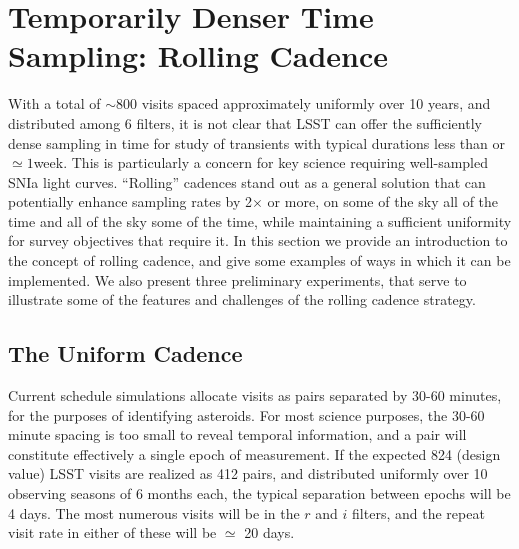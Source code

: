 %
%
%

\section{Temporarily Denser Time Sampling: Rolling Cadence}
\def\secname{rolling}\label{sec:\secname}


With a total of $\sim 800$ visits spaced approximately uniformly over 10
years, and distributed among 6 filters, it is not clear that LSST can
offer the sufficiently dense sampling in time for study of transients
with typical durations less than or $\simeq 1$week. This is particularly
a concern for key science requiring well-sampled SNIa light curves.
``Rolling'' cadences stand out as a general solution that can
potentially enhance sampling rates by 2$\times$ or more, on some of the
sky all of the time and all of the sky some of the time, while
maintaining a sufficient uniformity for survey objectives that require
it. In this section we provide an introduction to the concept of rolling
cadence, and give some examples of ways in which it can be implemented.
We also present three preliminary \OpSim experiments, that serve to
illustrate some of the features and challenges of the rolling cadence
strategy.


\subsection{The Uniform Cadence}

Current schedule simulations allocate visits as pairs separated by 30-60
minutes, for the purposes of identifying asteroids.  For most science
purposes, the 30-60 minute spacing is too small to reveal temporal
information, and a pair will constitute effectively a single epoch of
measurement.  If the expected 824 (design value) LSST visits are
realized as 412 pairs, and distributed uniformly over 10 observing
seasons of 6 months each, the typical separation between epochs will be
4 days.   The most numerous visits will be in the $r$ and $i$
filters, and the repeat visit rate in either of these will be $\simeq$
20 days.

